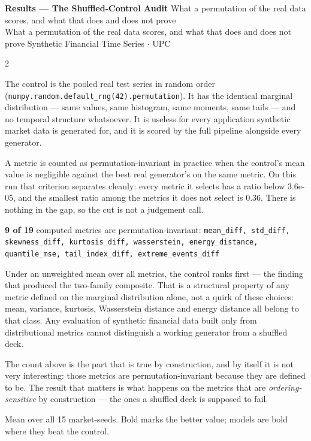 \documentclass[10pt]{article}
\newcommand{\skybox}[2]{\begin{tcolorbox}[mybox={Sky}{BBg},title={#1}]#2\end{tcolorbox}}
\newcommand{\amberbox}[2]{\begin{tcolorbox}[mybox={Amber}{ABg},title={#1}]#2\end{tcolorbox}}
\newcommand{\pagehead}[2]{%
  \begin{tcolorbox}[enhanced,arc=0pt,outer arc=0pt,boxrule=0pt,
    colback=Navy,colframe=Navy,
    top=5pt,bottom=5pt,left=8pt,right=8pt,
    before skip=0pt,after skip=10pt]
  {\color{white}\large\bfseries #1}%
  \ifx\relax#2\relax\else\\[1pt]{\color{blue!30!white}\small #2}\fi
  \hfill{\color{blue!20!white}\footnotesize Synthetic Financial Time Series $\cdot$ UPC}
  \end{tcolorbox}}
\begin{document}
\clearpage

\pagehead{Results --- The Shuffled-Control Audit}
         {What a permutation of the real data scores, and what that does and does not prove}

\begin{multicols}{2}

\skybox{Permutation-Invariance, Counted}{%
The control is the pooled real test series in random order (\texttt{numpy.random.default\_rng(42).permutation}). It has the identical marginal distribution --- same values, same histogram, same moments, same tails --- and no temporal structure whatsoever. It is useless for every application synthetic market data is generated for, and it is scored by the full pipeline alongside every generator.

\smallskip
A metric is counted as permutation-invariant in practice when the control's mean value is negligible against the best real generator's on the same metric. On this run that criterion separates cleanly: every metric it selects has a ratio below 3.6e-05, and the smallest ratio among the metrics it does not select is 0.36. There is nothing in the gap, so the cut is not a judgement call.

\smallskip
\textbf{9 of 19} computed metrics are permutation-invariant:
{\footnotesize\texttt{mean\_diff, std\_diff, skewness\_diff, kurtosis\_diff, wasserstein, energy\_distance, quantile\_mse, tail\_index\_diff, extreme\_events\_diff}}

\smallskip
Under an unweighted mean over all metrics, the control ranks first --- the finding that produced the two-family composite. That is a structural property of any metric defined on the marginal distribution alone, not a quirk of these choices: mean, variance, kurtosis, Wasserstein distance and energy distance all belong to that class. Any evaluation of synthetic financial data built only from distributional metrics cannot distinguish a working generator from a shuffled deck.}

\amberbox{The Harder Finding (Table~3)}{%
The count above is the part that is true by construction, and by itself it is not very interesting: those metrics are permutation-invariant because they are defined to be. The result that matters is what happens on the metrics that are \emph{ordering-sensitive} by construction --- the ones a shuffled deck is supposed to fail.

\smallskip
Mean over all 15 market-seeds. Bold marks the better value; models are bold where they beat the control.

}
\end{multicols}
\end{document}
